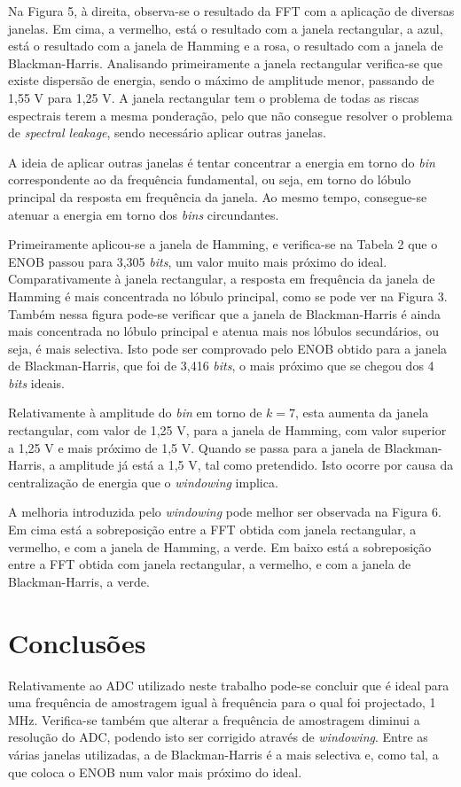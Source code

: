 \documentclass[11pt]{article}
\numberwithin{equation}{section}
\begin{document}
Na Figura 5, à direita, observa-se o resultado da FFT com a aplicação de diversas janelas. Em cima, a vermelho, está o resultado com a janela rectangular, a azul, está o resultado com a janela de Hamming e a rosa, o resultado com a janela de Blackman-Harris. Analisando primeiramente a janela rectangular verifica-se que existe dispersão de energia, sendo o máximo de amplitude menor, passando de 1,55 V para 1,25 V. A janela rectangular tem o problema de todas as riscas espectrais terem a mesma ponderação, pelo que não consegue resolver o problema de \textit{spectral leakage}, sendo necessário aplicar outras janelas.

A ideia de aplicar outras janelas é tentar concentrar a energia em torno do \textit{bin} correspondente ao da frequência fundamental, ou seja, em torno do lóbulo principal da resposta em frequência da janela. Ao mesmo tempo, consegue-se atenuar a energia em torno dos \textit{bins} circundantes.

Primeiramente aplicou-se a janela de Hamming, e verifica-se na Tabela 2 que o ENOB passou para 3,305 \textit{bits}, um valor muito mais próximo do ideal. Comparativamente à janela rectangular, a resposta em frequência da janela de Hamming é mais concentrada no lóbulo principal, como se pode ver na Figura 3. Também nessa figura pode-se verificar que a janela de Blackman-Harris é ainda mais concentrada no lóbulo principal e atenua mais nos lóbulos secundários, ou seja, é mais selectiva. Isto pode ser comprovado pelo ENOB obtido para a janela de Blackman-Harris, que foi de 3,416 \textit{bits}, o mais próximo que se chegou dos 4 \textit{bits} ideais.

Relativamente à amplitude do \textit{bin} em torno de $k = 7$, esta aumenta da janela rectangular, com valor de 1,25 V, para a janela de Hamming, com valor superior a 1,25 V e mais próximo de 1,5 V. Quando se passa para a janela de Blackman-Harris, a amplitude já está a 1,5 V, tal como pretendido. Isto ocorre por causa da centralização de energia que o \textit{windowing} implica.

A melhoria introduzida pelo \textit{windowing} pode melhor ser observada na Figura 6. Em cima está a sobreposição entre a FFT obtida com janela rectangular, a vermelho, e com a janela de Hamming, a verde. Em baixo está a sobreposição entre a FFT obtida com janela rectangular, a vermelho, e com a janela de Blackman-Harris, a verde.

\section{Conclusões}

Relativamente ao ADC utilizado neste trabalho pode-se concluir que é ideal para uma frequência de amostragem igual à frequência para o qual foi projectado, 1 MHz. Verifica-se também que alterar a frequência de amostragem diminui a resolução do ADC, podendo isto ser corrigido através de \textit{windowing}. Entre as várias janelas utilizadas, a de Blackman-Harris é a mais selectiva e, como tal, a que coloca o ENOB num valor mais próximo do ideal.
	 
\end{document}
